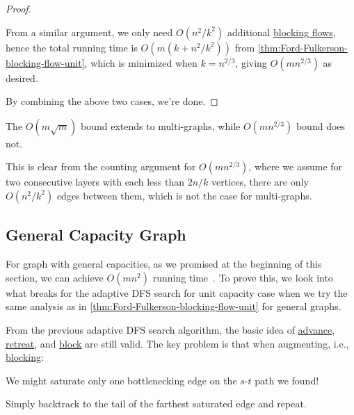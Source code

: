 \begin{proof}
\begin{explanation}
		From a similar argument, we only need \(O(n^2 / k^2)\) additional \hyperref[def:blocking-flow]{blocking flows}, hence the total running time is \(O(m (k + n^2 / k^2))\) from \autoref{thm:Ford-Fulkerson-blocking-flow-unit}, which is minimized when \(k = n^{2 / 3}\), giving \(O(mn^{2 / 3})\) as desired.
	\end{explanation}

	By combining the above two cases, we're done.
\end{proof}

\begin{remark}
	The \(O(m \sqrt{m} )\) bound extends to multi-graphs, while \(O(mn^{2 / 3})\) bound does not.
\end{remark}
\begin{explanation}
	This is clear from the counting argument for \(O(mn^{2 / 3})\), where we assume for two consecutive layers with each less than \(2n / k\) vertices, there are only \(O(n^2 / k^2)\) edges between them, which is not the case for multi-graphs.
\end{explanation}

\subsection{General Capacity Graph}
For graph with general capacities, as we promised at the beginning of this section, we can achieve \(O(mn^2)\) running time~\cite{karzanov1973finding,dinic1970algorithm,goldberg1998beyond}. To prove this, we look into what breaks for the adaptive DFS search for unit capacity case when we try the same analysis as in \autoref{thm:Ford-Fulkerson-blocking-flow-unit} for general graphs.

From the previous adaptive DFS search algorithm, the basic idea of \hyperref[algo:unit-adaptive-DFS-advance]{advance}, \hyperref[algo:unit-adaptive-DFS-retreat]{retreat}, and \hyperref[algo:unit-adaptive-DFS-block]{block} are still valid. The key problem is that when augmenting, i.e., \hyperref[algo:unit-adaptive-DFS-block]{blocking}:

\begin{problem*}
	We might saturate only one bottlenecking edge on the \(s\)-\(t\) path we found!
\end{problem*}
\begin{answer}
	Simply backtrack to the tail of the farthest saturated edge and repeat.
\end{answer}

